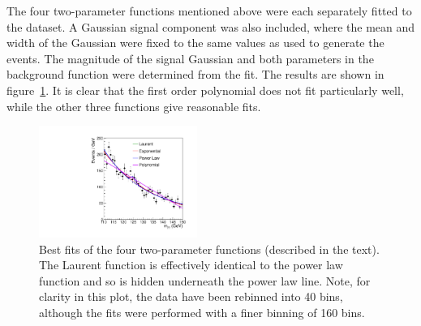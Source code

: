The four two-parameter functions mentioned above were each
separately fitted to the dataset. A Gaussian signal component was also included, where the
mean and width of the Gaussian were fixed to the same values as used to
generate the events.
The magnitude of the signal Gaussian and both parameters in the
background function were determined from the fit.
The results are shown in figure~\ref{fig:functions:bestfits}.
It is clear that the first order polynomial does not fit particularly well,
while the other three functions give reasonable fits.
%
\begin{figure}[tbp]
\centering
\includegraphics[width=0.46\textwidth]{functions/BestFits.pdf}
\caption{Best fits of the four two-parameter functions (described in the
text).
The Laurent function is effectively identical to the power law function
and so is hidden underneath the power law line.
Note, for clarity in this plot, the
data have been rebinned into 40 bins, although the fits were performed with
a finer binning of 160 bins.}
\label{fig:functions:bestfits}
\end{figure}

